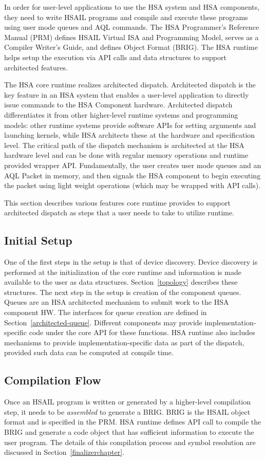 \documentclass[final]{book}
\begin{document}
In order for user-level applications to use the HSA system and HSA components,
they need to write HSAIL programs and compile and execute these programs using
user mode queues and AQL commands. The HSA Programmer's Reference Manual (PRM)
defines HSAIL Virtual ISA and Programming Model, serves as a Compiler Writer's
Guide, and defines Object Format (BRIG). The HSA runtime helps setup the
execution via API calls and data structures to support architected features.

The HSA core runtime realizes architected dispatch. Architected dispatch is the
key feature in an HSA system that enables a user-\/level application to directly
issue commands to the HSA Component hardware. Architected dispatch
differentiates it from other higher-\/level runtime systems and programming
models: other runtime systems provide software APIs for setting arguments and
launching kernels, while HSA architects these at the hardware and specification
level. The critical path of the dispatch mechanism is architected at the HSA
hardware level and can be done with regular memory operations and runtime
provided wrapper API. Fundamentally, the user creates user mode queues and an
AQL Packet in memory, and then signals the HSA component to begin executing the
packet using light weight operations (which may be wrapped with API calls).

This section describes various features core runtime provides to support
architected dispatch as steps that a user needs to take to utilize runtime.

\subsection{Initial Setup}
One of the first steps in the setup is that of device discovery. Device
discovery is performed at the initialization of the core runtime and information
is made available to the user as data structures. Section~\ref{topology}
describes these structures. The next step in the setup is creation of the
component queues. Queues are an HSA architected mechanism to submit work to the
HSA component HW. The interfaces for queue creation are defined in
Section~\ref{architected-queue}. Different components may provide
implementation-\/specific code under the core API for these functions. HSA
runtime also includes mechanisms to provide implementation-\/specific data as
part of the dispatch, provided such data can be computed at compile time.

\subsection{Compilation Flow}
Once an HSAIL program is written or generated by a higher-level compilation
step, it needs to be \emph{assembled} to generate a BRIG. BRIG is the HSAIL
object format and is specified in the PRM. HSA runtime defines API call to
compile the BRIG and generate a code object that has sufficient information to
execute the user program. The details of this compilation process and symbol
resolution are discussed in Section~\ref{finalizerchapter}.
\end{document}
